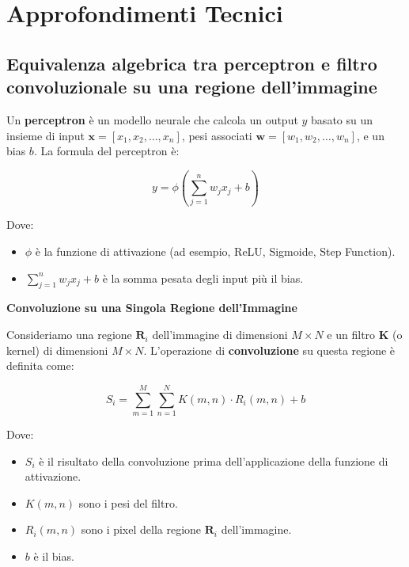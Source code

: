 \chapter{Approfondimenti Tecnici}
\label{appendix:B}

\section*{Equivalenza algebrica tra perceptron e filtro convoluzionale su una regione dell'immagine}

Un \textbf{perceptron} è un modello neurale che calcola un output \( y \) basato su un insieme di input \( \mathbf{x} = [x_1, x_2, \dots, x_n] \), pesi associati \( \mathbf{w} = [w_1, w_2, \dots, w_n] \), e un bias \( b \). La formula del perceptron è:

\[
y = \phi\left(\sum_{j=1}^{n} w_j x_j + b\right)
\]

Dove:
\begin{itemize}
    \item \( \phi \) è la funzione di attivazione (ad esempio, ReLU, Sigmoide, Step Function).
    \item \( \sum_{j=1}^{n} w_j x_j + b \) è la somma pesata degli input più il bias.
\end{itemize}

\noindent\textbf{Convoluzione su una Singola Regione dell'Immagine}

\vspace{0.5em} %

\noindent Consideriamo una regione \( \mathbf{R}_i \) dell'immagine di dimensioni \( M \times N \) e un filtro \( \mathbf{K} \) (o kernel) di dimensioni \( M \times N \). L'operazione di \textbf{convoluzione} su questa regione è definita come:

\[
S_i = \sum_{m=1}^{M} \sum_{n=1}^{N} K(m,n) \cdot R_i(m,n) + b
\]

Dove:
\begin{itemize}
    \item \( S_i \) è il risultato della convoluzione prima dell'applicazione della funzione di attivazione.
    \item \( K(m,n) \) sono i pesi del filtro.
    \item \( R_i(m,n) \) sono i pixel della regione \( \mathbf{R}_i \) dell'immagine.
    \item \( b \) è il bias.
\end{itemize}

